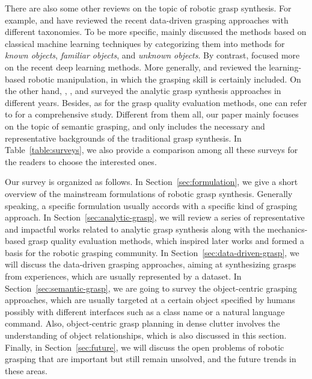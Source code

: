 \documentclass[letterpaper,10pt]{article}
\newcommand{\secref}[1]{Section~\ref{#1}}
\newcommand{\tabref}[1]{Table~\ref{#1}}
\begin{document}
There are also some other reviews on the topic of robotic grasp synthesis.
For example, \cite{bohg2013data} and \cite{kleeberger2020survey} have reviewed the recent data-driven grasping approaches with different taxonomies. 
To be more specific, \cite{bohg2013data} mainly discussed the methods based on classical machine learning techniques by categorizing them into methods for {\it known objects}, {\it familiar objects}, and {\it unknown objects}. 
By contrast, \cite{kleeberger2020survey} focused more on the recent deep learning methods.
More generally, \cite{kroemer2021review} and \cite{cong2021comprehensive} reviewed the learning-based robotic manipulation, in which the grasping skill is certainly included.
On the other hand, \cite{sahbani2012overview}, \cite{bicchi2000robotic}, and \cite{shimoga1996robot} surveyed the analytic grasp synthesis approaches in different years.
Besides, as for the grasp quality evaluation methods, one can refer to \cite{roa2015grasp} for a comprehensive study.
Different from them all, our paper mainly focuses on the topic of semantic grasping, and only includes the necessary and representative backgrounds of the traditional grasp synthesis.
In \tabref{table:surveys}, we also provide a comparison among all these surveys for the readers to choose the interested ones.

Our survey is organized as follows. 
In \secref{sec:formulation}, we give a short overview of the mainstream formulations of robotic grasp synthesis. Generally speaking, a specific formulation usually accords with a specific kind of grasping approach.
In \secref{sec:analytic-grasp}, we will review a series of representative and impactful works related to analytic grasp synthesis along with the mechanics-based grasp quality evaluation methods, which inspired later works and formed a basis for the robotic grasping community. 
In \secref{sec:data-driven-grasp}, we will discuss the data-driven grasping approaches, aiming at synthesizing grasps from experiences, which are usually represented by a dataset. 
In \secref{sec:semantic-grasp}, we are going to survey the object-centric grasping approaches, which are usually targeted at a certain object specified by humans possibly with different interfaces such as a class name or a natural language command. Also, object-centric grasp planning in dense clutter involves the understanding of object relationships, which is also discussed in this section.
Finally, in \secref{sec:future}, we will discuss the open problems of robotic grasping that are important but still remain unsolved, and the future trends in these areas.
\end{document}
